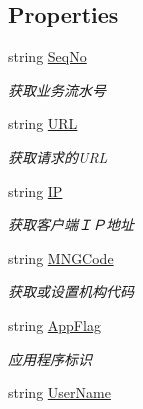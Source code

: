 \subsection*{Properties}
\begin{DoxyCompactItemize}
\item 
string \hyperlink{class_krs_1_1_base_1_1_logs_1_1_log_message_info_adb1c24e24aba48719cb0cd0fbf010853}{Seq\-No}
\begin{DoxyCompactList}\small\item\em 获取业务流水号 \end{DoxyCompactList}\item 
string \hyperlink{class_krs_1_1_base_1_1_logs_1_1_log_message_info_ac4632df2e0cca88fce2921fcb17f7cc4}{U\-R\-L}
\begin{DoxyCompactList}\small\item\em 获取请求的\-U\-R\-L \end{DoxyCompactList}\item 
string \hyperlink{class_krs_1_1_base_1_1_logs_1_1_log_message_info_a929c7020a27daafba8b665686b35d202}{I\-P}
\begin{DoxyCompactList}\small\item\em 获取客户端ＩＰ地址 \end{DoxyCompactList}\item 
string \hyperlink{class_krs_1_1_base_1_1_logs_1_1_log_message_info_a757c814599d8b9620cd075da3e9026a9}{M\-N\-G\-Code}
\begin{DoxyCompactList}\small\item\em 获取或设置机构代码 \end{DoxyCompactList}\item 
string \hyperlink{class_krs_1_1_base_1_1_logs_1_1_log_message_info_a13105a83b923a9e1a27de4487eb88d3f}{App\-Flag}
\begin{DoxyCompactList}\small\item\em 应用程序标识 \end{DoxyCompactList}\item 
string \hyperlink{class_krs_1_1_base_1_1_logs_1_1_log_message_info_a8fa26acb35e4aa3e7aebb41f3ad9a431}{User\-Name}

\end{DoxyCompactItemize}
